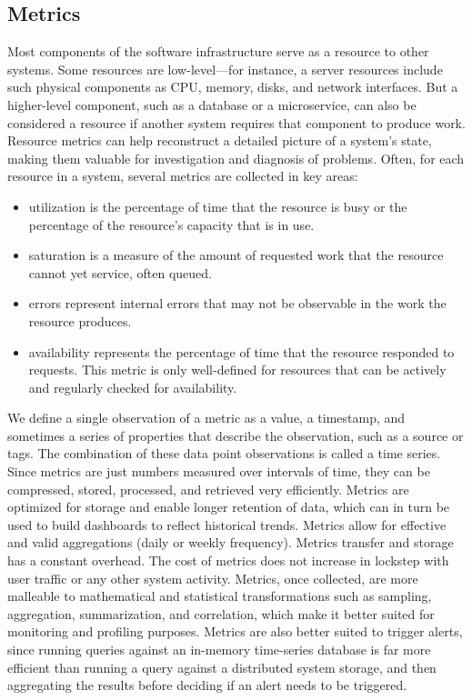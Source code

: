 \subsection{Metrics}
Most components of the software infrastructure serve as a resource to other systems. Some resources are low-level—for instance, a server resources include such physical components as CPU, memory, disks, and network interfaces. But a higher-level component, such as a database or a microservice, can also be considered a resource if another system requires that component to produce work. Resource metrics can help reconstruct a detailed picture of a system's state, making them valuable for investigation and diagnosis of problems. Often, for each resource in a system, several metrics are collected in key areas:
\begin{itemize}
    \item utilization is the percentage of time that the resource is busy or the percentage of the resource’s capacity that is in use.
    \item saturation is a measure of the amount of requested work that the resource cannot yet service, often queued.
    \item errors represent internal errors that may not be observable in the work the resource produces.
    \item availability represents the percentage of time that the resource responded to requests. This metric is only well-defined for resources that can be actively and regularly checked for availability.
\end{itemize}

We define a single observation of a metric as a value, a timestamp, and sometimes a series of properties that describe the observation, such as a source or tags. The combination of these data point observations is called a time series. Since metrics are just numbers measured over intervals of time, they can be compressed, stored, processed, and retrieved very efficiently. Metrics are optimized for storage and enable longer retention of data, which can in turn be used to build dashboards to reflect historical trends. Metrics allow for effective and valid aggregations (daily or weekly frequency). Metrics transfer and storage has a constant overhead. The cost of metrics does not increase in lockstep with user traffic or any other system activity. Metrics, once collected, are more malleable to mathematical and statistical transformations such as sampling, aggregation, summarization, and correlation, which make it better suited for monitoring and profiling purposes. Metrics are also better suited to trigger alerts, since running queries against an in-memory time-series database is far more efficient than running a query against a distributed system storage, and then aggregating the results before deciding if an alert needs to be triggered.

